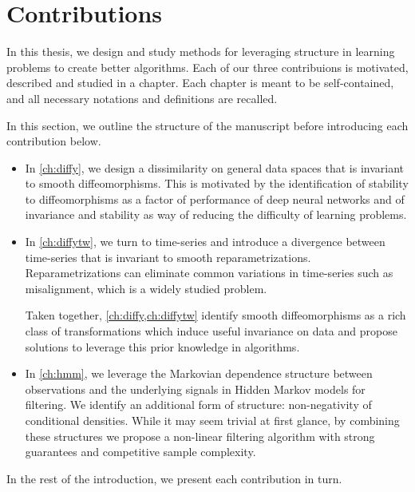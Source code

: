 \section{Contributions}

In this thesis, we design and study methods for leveraging structure in learning problems to create better algorithms.
Each of our three contribuions is motivated, described and studied in a chapter. Each chapter is meant to be self-contained, and all necessary notations and definitions are recalled.

In this section, we outline the structure of the manuscript before introducing each contribution below.

\begin{itemize}
\item In \cref{ch:diffy}, we design a dissimilarity on general data spaces that is invariant to smooth diffeomorphisms. This is motivated by the identification of stability to diffeomorphisms as a factor of performance of deep neural networks and of invariance and stability as way of reducing the difficulty of learning problems.

\item In \cref{ch:diffytw}, we turn to time-series and introduce a divergence between time-series that is invariant to smooth reparametrizations. Reparametrizations can eliminate common variations in time-series such as misalignment, which is a widely studied problem.

\medskip

Taken together, \cref{ch:diffy,ch:diffytw} identify smooth diffeomorphisms as a rich class of transformations which induce useful invariance on data and propose solutions to leverage this prior knowledge in algorithms.

\item  In \cref{ch:hmm}, we leverage the Markovian dependence structure between observations and the underlying signals in Hidden Markov models for filtering. We identify an additional form of structure: non-negativity of conditional densities. While it may seem trivial at first glance, by combining these structures we propose a non-linear filtering algorithm with strong guarantees and competitive sample complexity.
\end{itemize}

\noindent In the rest of the introduction, we present each contribution in turn.
\pagebreak

